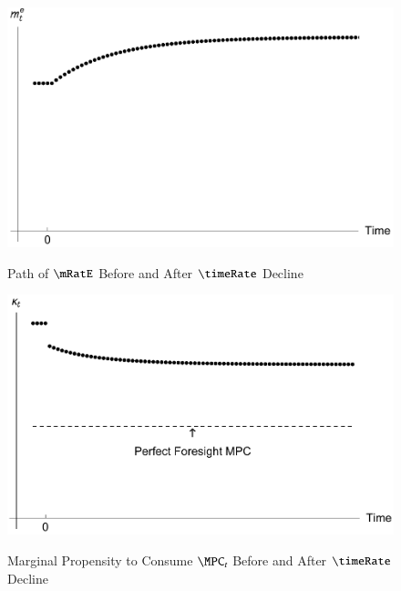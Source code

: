 \documentclass[titlepage,abstract]{\econtex}\newcommand{\texname}{ctDiscrete}
\begin{document}
\begin{figure}%
\caption{Path of $\mRatE$ Before and After $\timeRate$ Decline}%
\includegraphics{./Figures/mPathAfterThetaDrop}%
\label{fig:mPathAfterThetaDrop}%
\end{figure}

\begin{figure}%
\caption{Marginal Propensity to Consume $\MPC_{t}$ Before and After $\timeRate$ Decline}%
\medskip%
\includegraphics{./Figures/MPCPathAfterThetaDrop}%
\label{fig:MPCPathAfterThetaDrop}%
\end{figure}

\clearpage%
\end{document}
